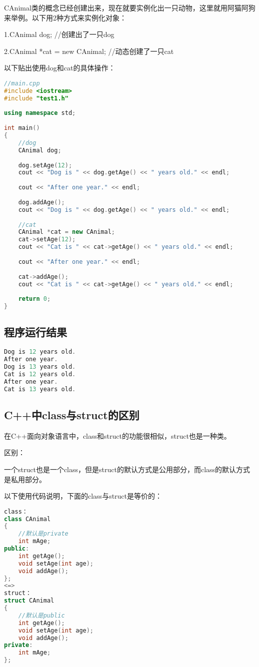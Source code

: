 \documentclass{article}
\begin{document}
CAnimal类的概念已经创建出来，现在就要实例化出一只动物，这里就用阿猫阿狗来举例。以下用2种方式来实例化对象：

1.CAnimal dog; //创建出了一只dog

2.CAnimal *cat = new CAnimal; //动态创建了一只cat

以下贴出使用dog和cat的具体操作：
\begin{lstlisting}[language=c++]
//main.cpp  
#include <iostream>  
#include "test1.h"  
  
using namespace std;  
  
int main()  
{  
    //dog  
    CAnimal dog;  
  
    dog.setAge(12);  
    cout << "Dog is " << dog.getAge() << " years old." << endl;  
  
    cout << "After one year." << endl;  
  
    dog.addAge();  
    cout << "Dog is " << dog.getAge() << " years old." << endl;  
  
    //cat  
    CAnimal *cat = new CAnimal;  
    cat->setAge(12);  
    cout << "Cat is " << cat->getAge() << " years old." << endl;  
  
    cout << "After one year." << endl;  
  
    cat->addAge();  
    cout << "Cat is " << cat->getAge() << " years old." << endl;  
  
    return 0;  
}  
\end{lstlisting}
\subsection{程序运行结果}
\label{sec-3-6}
\begin{lstlisting}[language=c++]
Dog is 12 years old.  
After one year.  
Dog is 13 years old.  
Cat is 12 years old.  
After one year.  
Cat is 13 years old.  
\end{lstlisting}
\subsection{C++中class与struct的区别}
\label{sec-3-7}
在C++面向对象语言中，class和struct的功能很相似，struct也是一种类。

区别：

一个struct也是一个class，但是struct的默认方式是公用部分，而class的默认方式是私用部分。

以下使用代码说明，下面的class与struct是等价的：
\begin{lstlisting}[language=c++]
class：  
class CAnimal  
{  
    //默认是private  
    int mAge;  
public:  
    int getAge();  
    void setAge(int age);  
    void addAge();  
};  
<=>  
struct：  
struct CAnimal  
{  
    //默认是public  
    int getAge();  
    void setAge(int age);  
    void addAge();  
private:  
    int mAge;  
};  
\end{lstlisting}
\end{document}
